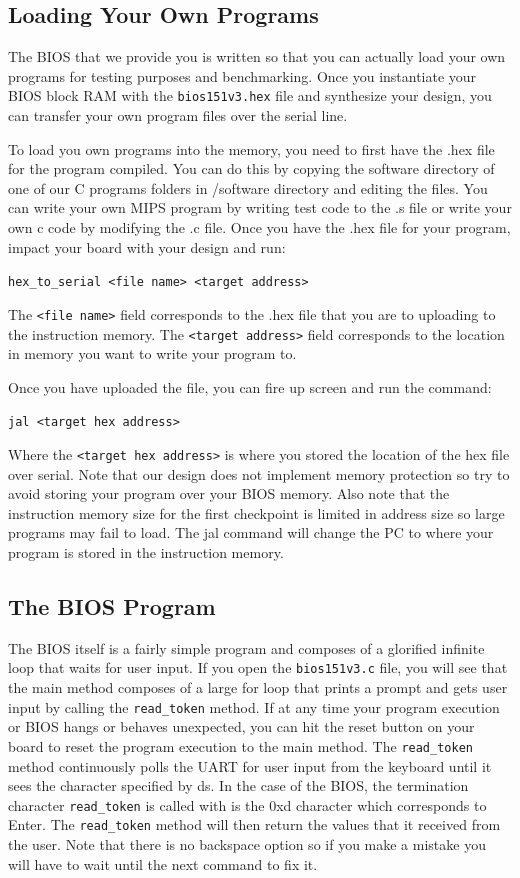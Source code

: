 \documentclass[11pt]{article}
\begin{document}
\subsection{Loading Your Own Programs}
The BIOS that we provide you is written so that you can actually load your own programs for
testing purposes and benchmarking. Once you instantiate your BIOS block RAM with the
\verb|bios151v3.hex| file and synthesize your design, you can transfer your own program files over the
serial line.

To load you own programs into the memory, you need to first have the .hex file for the program
compiled. You can do this by copying the software directory of one of our C programs folders in
/software directory and editing the files. You can write your own MIPS program by writing
test code to the .s file or write your own c code by modifying the .c file.
Once you have the .hex file for your program, impact your board with your design and run:

\verb|hex_to_serial <file name> <target address>|

The \verb|<file name>| field corresponds to the .hex file that you are to uploading to the instruction
memory. The \verb|<target address>| field corresponds to the location in memory you want to write
your program to.

Once you have uploaded the file, you can fire up screen and run the command:

\verb|jal <target hex address>|

Where the \verb|<target hex address>| is where you stored the location of the hex file over
serial. Note that our design does not implement memory protection so try to avoid storing your
program over your BIOS memory. Also note that the instruction memory size for the first
checkpoint is limited in address size so large programs may fail to load.
The jal command will change the PC to where your program is stored in the instruction
memory.

\subsection{The BIOS Program}
The BIOS itself is a fairly simple program and composes of a glorified infinite loop that waits for
user input. If you open the \verb|bios151v3.c| file, you will see that the main method composes of a
large for loop that prints a prompt and gets user input by calling the \verb|read_token| method.
If at any time your program execution or BIOS hangs or behaves unexpected, you can hit the
reset button on your board to reset the program execution to the main method.
The \verb|read_token| method continuously polls the UART for user input from the keyboard until it
sees the character specified by ds. In the case of the BIOS, the termination character
\verb|read_token| is called with is the 0xd character which corresponds to Enter.
The \verb|read_token| method will then return the values that it received from the user. Note that
there is no backspace option so if you make a mistake you will have to wait until the next
command to fix it.
\end{document}
